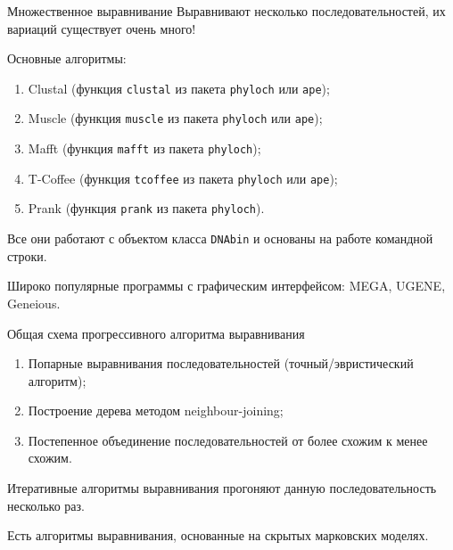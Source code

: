 \documentclass[
  ignorenonframetext,
  russian,
]{beamer}
\providecommand{\tightlist}{%
  \setlength{\itemsep}{0pt}\setlength{\parskip}{0pt}}
\begin{document}
\begin{frame}[fragile]{Множественное выравнивание}
\protect{}\label{ux43cux43dux43eux436ux435ux441ux442ux432ux435ux43dux43dux43eux435-ux432ux44bux440ux430ux432ux43dux438ux432ux430ux43dux438ux435}
Выравнивают несколько последовательностей, их вариаций существует очень
много!

Основные алгоритмы:

\begin{enumerate}
\tightlist
\item
  Clustal (функция \texttt{clustal} из пакета \texttt{phyloch} или
  \texttt{ape});
\item
  Muscle (функция \texttt{muscle} из пакета \texttt{phyloch} или
  \texttt{ape});
\item
  Mafft (функция \texttt{mafft} из пакета \texttt{phyloch});
\item
  T-Coffee (функция \texttt{tcoffee} из пакета \texttt{phyloch} или
  \texttt{ape});
\item
  Prank (функция \texttt{prank} из пакета \texttt{phyloch}).
\end{enumerate}

Все они работают с объектом класса \texttt{DNAbin} и основаны на работе
командной строки.

Широко популярные программы с графическим интерфейсом: MEGA, UGENE,
Geneious.
\end{frame}

\begin{frame}{Общая схема прогрессивного алгоритма выравнивания}
\protect{}\label{ux43eux431ux449ux430ux44f-ux441ux445ux435ux43cux430-ux43fux440ux43eux433ux440ux435ux441ux441ux438ux432ux43dux43eux433ux43e-ux430ux43bux433ux43eux440ux438ux442ux43cux430-ux432ux44bux440ux430ux432ux43dux438ux432ux430ux43dux438ux44f}
\begin{enumerate}
\item
  Попарные выравнивания последовательностей (точный/эвристический
  алгоритм);
\item
  Построение дерева методом neighbour-joining;
\item
  Постепенное объединение последовательностей от более схожим к менее
  схожим.
\end{enumerate}

Итеративные алгоритмы выравнивания прогоняют данную последовательность
несколько раз.

Есть алгоритмы выравнивания, основанные на скрытых марковских моделях.
\end{frame}
\end{document}
